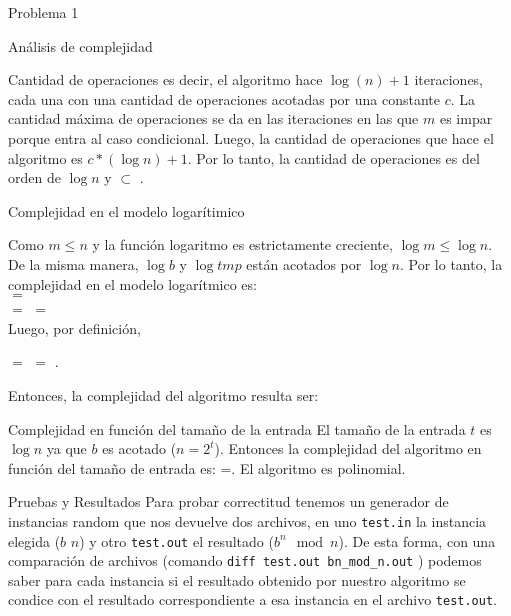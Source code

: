 \begin{section}{Problema 1}
\begin{subsection}{Análisis de complejidad}
\begin{subsubsection}{Cantidad de operaciones}
			\noindent es decir, el algoritmo hace $\log(n)+1$ iteraciones, cada una con una cantidad de operaciones acotadas por una constante $c$. La cantidad máxima de
			operaciones se da en las iteraciones en las que $m$ es impar porque entra al caso condicional. Luego, la cantidad de operaciones que hace el algoritmo es $c*(\log n)+1$.
			Por lo tanto, la cantidad de operaciones es del orden de $\log n$ y  $\subset$ .

		\end{subsubsection}


		\begin{subsubsection}{Complejidad en el modelo logarítimico}

			Como $m\leq n$ y la función logaritmo es estrictamente creciente, $\log m \leq \log n$. De la misma manera, $\log b$ y $\log tmp$ están acotados por $\log n$. Por lo tanto, la complejidad en el modelo logarítmico es: \\
			 $=$ \\
			$=$  $=$  \\

			Luego, por definición, 
			\begin{center}
				 $=$  $=$ .
			\end{center}

			Entonces, la complejidad del algoritmo resulta ser: \VSP
		
		\end{subsubsection}


		\begin{subsubsection}{Complejidad en función del tamaño de la entrada}
			El tamaño de la entrada $t$ es $\log n$ ya que $b$ es acotado ($n=2^t$). Entonces la complejidad del algoritmo en función del tamaño de entrada es: =. El algoritmo es polinomial.
		\end{subsubsection}

	\end{subsection}
	\begin{subsection}{Pruebas y Resultados}
		Para probar correctitud tenemos un generador de instancias random que nos devuelve dos archivos, en uno \texttt{test.in} la instancia elegida ($b$ $n$) y otro \texttt{test.out} el resultado ($b^n \mod n$). De esta forma, con una comparación de archivos (comando \texttt{diff test.out bn\_mod\_n.out} ) podemos saber para cada instancia si el resultado obtenido por nuestro algoritmo se condice con el resultado correspondiente a esa instancia en el archivo \texttt{test.out}.
		

\end{subsection}
\end{section}
